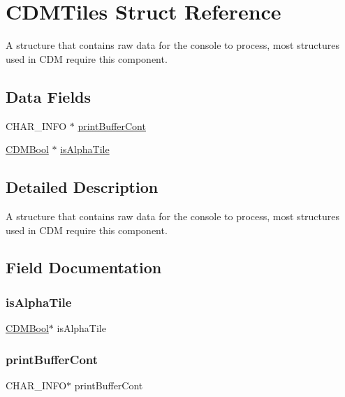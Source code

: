 \hypertarget{struct_c_d_m_tiles}{}\section{C\+D\+M\+Tiles Struct Reference}
\label{struct_c_d_m_tiles}


A structure that contains raw data for the console to process, most structures used in C\+DM require this component.  


\subsection*{Data Fields}
\begin{DoxyCompactItemize}
\item 
C\+H\+A\+R\+\_\+\+I\+N\+FO $\ast$ \mbox{\hyperlink{struct_c_d_m_tiles_a56fbdbebe0049831b3ade698fabb9ab2}{print\+Buffer\+Cont}}
\item 
\mbox{\hyperlink{_c_d_m_8h_af5296d3141c193195e69417d1825228b}{C\+D\+M\+Bool}} $\ast$ \mbox{\hyperlink{struct_c_d_m_tiles_a462bed3f7fab03fa6f131587431a6ee2}{is\+Alpha\+Tile}}
\end{DoxyCompactItemize}


\subsection{Detailed Description}
A structure that contains raw data for the console to process, most structures used in C\+DM require this component. 

\subsection{Field Documentation}
\mbox{\label{struct_c_d_m_tiles_a462bed3f7fab03fa6f131587431a6ee2}} 
\subsubsection{\texorpdfstring{is\+Alpha\+Tile}{isAlphaTile}}
{\footnotesize\ttfamily \mbox{\hyperlink{_c_d_m_8h_af5296d3141c193195e69417d1825228b}{C\+D\+M\+Bool}}$\ast$ is\+Alpha\+Tile}

\mbox{\label{struct_c_d_m_tiles_a56fbdbebe0049831b3ade698fabb9ab2}} 
\subsubsection{\texorpdfstring{print\+Buffer\+Cont}{printBufferCont}}
{\footnotesize\ttfamily C\+H\+A\+R\+\_\+\+I\+N\+FO$\ast$ print\+Buffer\+Cont}

